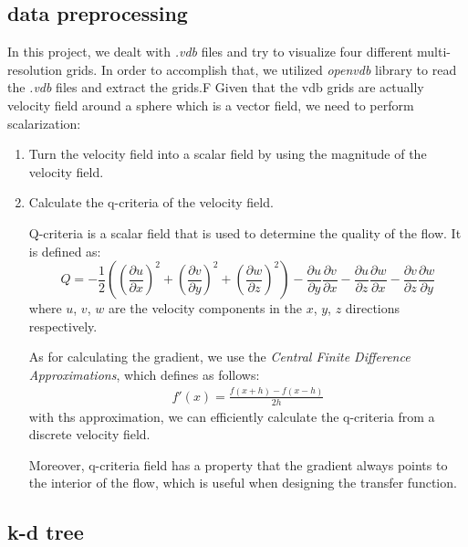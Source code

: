 \documentclass[acmtog]{acmart}
\begin{document}
    \subsection{data preprocessing}\label{subsec:data-preprocessing}
    In this project, we dealt with \emph{.vdb} files and try to visualize four different multi-resolution grids.
    In order to accomplish that, we utilized \emph{openvdb} library to read the \emph{.vdb} files and extract the grids.F
    Given that the vdb grids are actually velocity field around a sphere which is a vector field, we need to perform scalarization:
    \begin{enumerate}
        \item Turn the velocity field into a scalar field by using the magnitude of the velocity field.
        \item Calculate the q-criteria of the velocity field.
        \par Q-criteria is a scalar field that is used to determine the quality of the flow.
        It is defined as:
        \begin{equation}
            Q = -\frac{1}{2}\left( \left( \frac{\partial u}{\partial x} \right)^2 + \left( \frac{\partial v}{\partial y} \right)^2 + \left( \frac{\partial w}{\partial z} \right)^2 \right) - \frac{\partial u}{\partial y}\frac{\partial v}{\partial x} - \frac{\partial u}{\partial z}\frac{\partial w}{\partial x} - \frac{\partial v}{\partial z}\frac{\partial w}{\partial y}\label{eq:equation}
        \end{equation}
        where $u$, $v$, $w$ are the velocity components in the $x$, $y$, $z$ directions respectively.
        \par As for calculating the gradient, we use the \emph{Central Finite Difference Approximations}, which defines as follows:
        \begin{align*}
            f'(x)=\frac{f(x+h)-f(x-h)}{2h}
        \end{align*}
        with ths approximation, we can efficiently calculate the q-criteria from a discrete velocity field.
        \par Moreover, q-criteria field has a property that the gradient always points to the interior of the flow, which is useful when designing the transfer function.
    \end{enumerate}

    \subsection{k-d tree}\label{subsec:k-d-tree}
\end{document}
